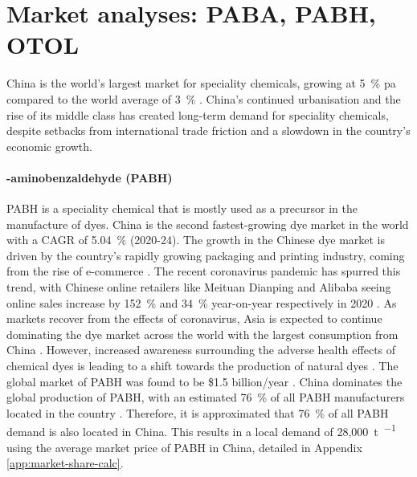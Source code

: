 \section{Market analyses: PABA, PABH, OTOL}
\label{sec:market-analysis}
China is the world’s largest market for speciality chemicals, growing at \SI{5}{\percent} pa compared to the world average of \SI{3}{\percent} \cite{blad_game_nodate}. China’s continued urbanisation and the rise of its middle class has created long-term demand for speciality chemicals, despite setbacks from international trade friction and a slowdown in the country’s economic growth.

\paragraph{\para-aminobenzaldehyde (PABH)}
PABH is a speciality chemical that is mostly used as a precursor in the manufacture of dyes. China is the second fastest-growing dye market in the world with a CAGR of \SI{5.04}{\percent} (2020-24). The growth in the Chinese dye market is driven by the country’s rapidly growing packaging and printing industry, coming from the rise of e-commerce \cite{reportlinker_synthetic_2021}. The recent coronavirus pandemic has spurred this trend, with Chinese online retailers like Meituan Dianping and Alibaba seeing online sales increase by \SI{152}{\percent} and \SI{34}{\percent} year-on-year respectively in 2020 \cite{kharpal_chinas_2020}. As markets recover from the effects of coronavirus, Asia is expected to continue dominating the dye market across the world with the largest consumption from China \cite{mordor_intelligence_dyes_2020}. However, increased awareness surrounding the adverse health effects of chemical dyes is leading to a shift towards the production of natural dyes \cite{reportlinker_synthetic_2021}. The global market of PABH was found to be \$1.5 billion/year \cite{report_express_global_2020}. China dominates the global production of PABH, with an estimated \SI{76}{\percent} of all PABH manufacturers located in the country \cite{molbase_chemical_e-commerce_4-amino-benzaldehyde_2020,panjiva_manufacturers_2021,chemexper_chemical_nodate}. Therefore, it is approximated that \SI{76}{\percent} of all PABH demand is also located in China. This results in a local demand of 28,\SI{000}{\tonne\per\year} using the average market price of PABH in China, detailed in Appendix \ref{app:market-share-calc}.

